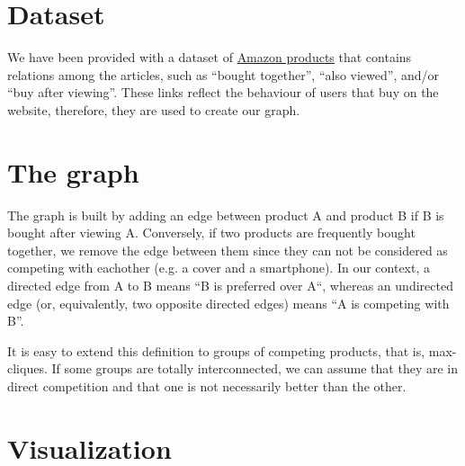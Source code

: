 \documentclass[a4paper,12pt]{article}
\begin{document}
\section{Dataset}
We have been provided with a dataset of \href{http://jmcauley.ucsd.edu/data/amazon/}{Amazon products} that contains relations among the articles, such as ``bought together'', ``also viewed'', and/or ``buy after viewing''. These links reflect the behaviour of users that buy on the website, therefore, they are used to create our graph.

\section{The graph}
The graph is built by adding an edge between product A and product B if B is bought after viewing A. Conversely, if two products are frequently bought together, we remove the edge between them since they can not be considered as competing with eachother (e.g. a cover and a smartphone). In our context, a directed edge from A to B means ``B is preferred over A``, whereas an undirected edge (or, equivalently, two opposite directed edges) means ``A is competing with B''.

It is easy to extend this definition to groups of competing products, that is, max-cliques. If some groups are totally interconnected, we can assume that they are in direct competition and that one is not necessarily better than the other. 

\section{Visualization}
\end{document}

